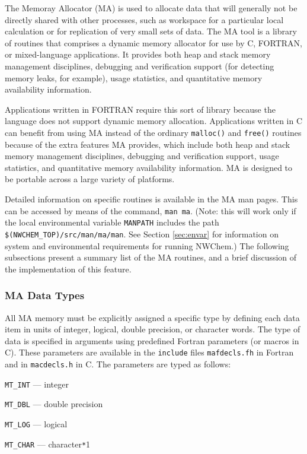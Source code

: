 \label{sec:ma}

The Memoray Allocator (MA) is used to allocate data that will generally not be directly
shared with other processes, such as workspace for a particular local
calculation or for replication of very small sets of data.  The MA tool
is a library of routines that comprises a dynamic memory allocator
for use by C, FORTRAN, or mixed-language applications.  It provides
both heap and stack memory management disciplines, debugging and
verification support (for detecting memory leaks, for example), usage
statistics, and quantitative memory availability information.

Applications written in FORTRAN
require this sort of library because the language does not
support dynamic memory allocation.  Applications written in C can benefit from
using MA instead of the ordinary {\tt malloc()} and {\tt free()}
routines because of the extra features MA provides, which include both heap and
stack memory management disciplines, debugging and verification
support, usage statistics, and quantitative memory availability
information.  MA is designed to be portable across a large variety of
platforms.

Detailed information on specific routines is available in the MA man pages.
This can be accessed by means of the command, {\tt man ma}.  (Note: this 
will work only if the local environmental variable {\tt MANPATH} includes
the path {\tt \$(NWCHEM\_TOP)/src/man/ma/man}.  See Section \ref{sec:envar}
for information on system and environmental requirements for running NWChem.)
The following subsections present a summary list of the MA routines, and 
a brief discussion of the implementation of this feature.

\subsubsection{MA Data Types}

All MA memory must be explicitly assigned a specific type by defining each
data item in units of integer, logical, 
double precision, or character words.  The type of data is specified
in arguments using predefined Fortran parameters (or macros in C).
These parameters are available in the \verb+include+ files \verb+mafdecls.fh+ in 
Fortran and in \verb+macdecls.h+ in C.  The parameters are typed as follows:

\begin{description} 
\item{\verb+MT_INT+} --- integer
\item{\verb+MT_DBL+} --- double precision
\item{\verb+MT_LOG+} --- logical
\item{\verb+MT_CHAR+} --- character\verb+*+1
\end{description}

